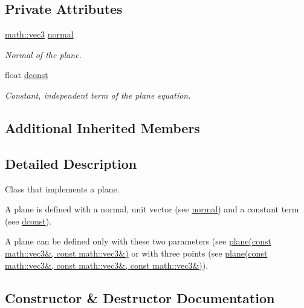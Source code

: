 \subsection*{Private Attributes}
\begin{DoxyCompactItemize}
\item 
\hyperlink{structphysim_1_1math_1_1vec3}{math\+::vec3} \hyperlink{classphysim_1_1geometry_1_1plane_a51656a31e9c941542f17d47d2ab976bf}{normal}
\begin{DoxyCompactList}\small\item\em Normal of the plane. \end{DoxyCompactList}\item 
\mbox{\label{classphysim_1_1geometry_1_1plane_aa29c5a4d71a1ee195a770e17b6ccdc87}} 
float \hyperlink{classphysim_1_1geometry_1_1plane_aa29c5a4d71a1ee195a770e17b6ccdc87}{dconst}
\begin{DoxyCompactList}\small\item\em Constant, independent term of the plane equation. \end{DoxyCompactList}\end{DoxyCompactItemize}
\subsection*{Additional Inherited Members}


\subsection{Detailed Description}
Class that implements a plane. 

A plane is defined with a normal, unit vector (see \hyperlink{classphysim_1_1geometry_1_1plane_a51656a31e9c941542f17d47d2ab976bf}{normal}) and a constant term (see \hyperlink{classphysim_1_1geometry_1_1plane_aa29c5a4d71a1ee195a770e17b6ccdc87}{dconst}).

A plane can be defined only with these two parameters (see \hyperlink{classphysim_1_1geometry_1_1plane_a9e1a0d74b5ecbbdb5b144003a915d64b}{plane(const math\+::vec3\&, const math\+::vec3\&)} or with three points (see \hyperlink{classphysim_1_1geometry_1_1plane_a7ff5e0444f792d759198fb7339c9dc1a}{plane(const math\+::vec3\&, const math\+::vec3\&, const math\+::vec3\&)}). 

\subsection{Constructor \& Destructor Documentation}
\mbox{\label{classphysim_1_1geometry_1_1plane_a9e1a0d74b5ecbbdb5b144003a915d64b}} 
